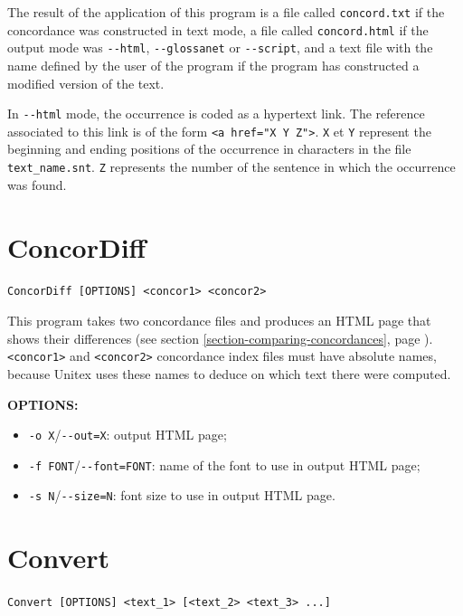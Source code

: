 \bigskip
\noindent The result of the application of this program is a file called \verb+concord.txt+
if the concordance was constructed in text mode, a file called
\verb+concord.html+ if the output mode was \verb+--html+, \verb+--glossanet+ or
\verb$--script$, and a text file with the name defined by the user of the program 
if the program has constructed a modified version of the text.

\bigskip
\noindent In \verb+--html+ mode, the occurrence is coded as a hypertext link. The reference
associated to this link is of the form \verb+<a href="X Y Z">+. \verb+X+ et
\verb+Y+ represent the beginning and ending positions of the occurrence in
characters in the file \verb+text_name.snt+. \verb+Z+ represents the number of
the sentence in which the occurrence was found.






\section{ConcorDiff}
\verb+ConcorDiff [OPTIONS] <concor1> <concor2>+

\bigskip
\noindent This program takes two concordance files and produces an HTML page
that shows their differences (see section
\ref{section-comparing-concordances}, page \pageref{section-comparing-concordances}). 
\verb+<concor1>+ and \verb+<concor2>+ concordance index files must 
have absolute names, because Unitex uses these names to deduce on which text
there were computed.

\bigskip
\noindent \textbf{OPTIONS:}
\begin{itemize}
  \item \verb+-o X+/\verb+--out=X+: output HTML page;
  \item \verb+-f FONT+/\verb+--font=FONT+: name of the font to use in output
  HTML page;
  \item \verb+-s N+/\verb+--size=N+: font size to use in output HTML page.
\end{itemize}







\section{Convert}
\verb+Convert [OPTIONS] <text_1> [<text_2> <text_3> ...]+

